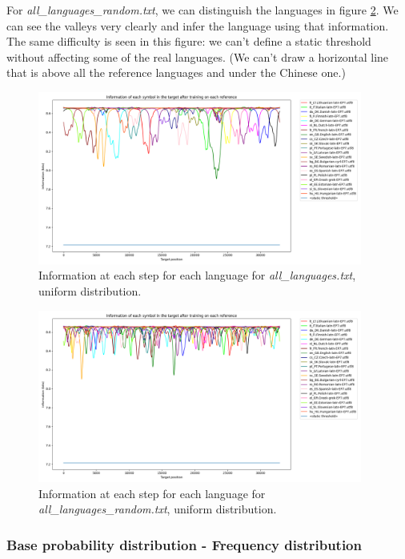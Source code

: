 \documentclass{article}
\begin{document}
For \textit{all\_languages\_random.txt}, we can distinguish the languages in figure \ref{fig:all_languages_random_p_u}.
We can see the valleys very clearly and infer the language using that information.
The same difficulty is seen in this figure: we can't define a static threshold without affecting some of the real languages.
(We can't draw a horizontal line that is above all the reference languages and under the Chinese one.)

\begin{figure}
    \centering
    \includegraphics[width=0.95\textwidth]{../results/all_languages/-p_u.png}
    \caption{Information at each step for each language for \textit{all\_languages.txt}, uniform distribution.}
    \label{fig:all_languages_p_u}
\end{figure}

\begin{figure}
    \centering
    \includegraphics[width=0.95\textwidth]{../results/all_languages_random/-p_u.png}
    \caption{Information at each step for each language for \textit{all\_languages\_random.txt}, uniform distribution.}
    \label{fig:all_languages_random_p_u}
\end{figure}

\subsubsection{Base probability distribution - Frequency distribution}
\label{subsubsec:results_locate_lang_frequency_distribution}
\end{document}
